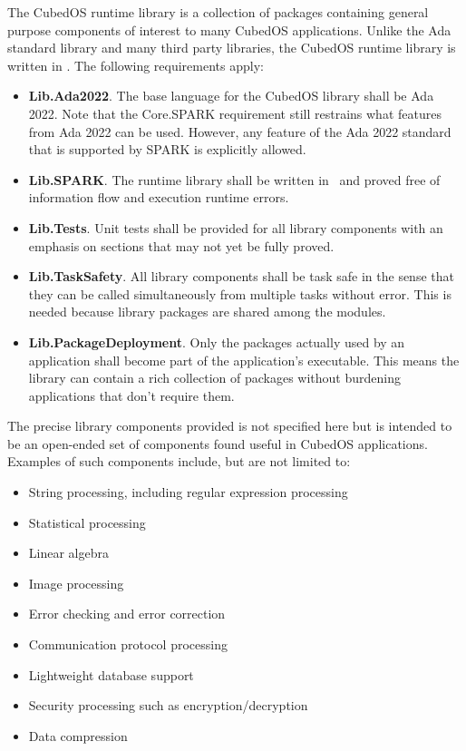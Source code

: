 The CubedOS runtime library is a collection of packages containing general purpose components of
interest to many CubedOS applications. Unlike the Ada standard library and many third party
libraries, the CubedOS runtime library is written in \SPARK. The following requirements apply:

\begin{itemize}
\item \textbf{Lib.Ada2022}. The base language for the CubedOS library shall be Ada 2022. Note
that the Core.SPARK requirement still restrains what features from Ada 2022 can be used.
However, any feature of the Ada 2022 standard that is supported by SPARK is explicitly allowed.

\item \textbf{Lib.SPARK}. The runtime library shall be written in \SPARK\ and proved free of
information flow and execution runtime errors.

\item \textbf{Lib.Tests}. Unit tests shall be provided for all library components with an
emphasis on sections that may not yet be fully proved.

\item \textbf{Lib.TaskSafety}. All library components shall be task safe in the sense that they
can be called simultaneously from multiple tasks without error. This is needed because library
packages are shared among the modules.

\item \textbf{Lib.PackageDeployment}. Only the packages actually used by an application shall
become part of the application's executable. This means the library can contain a rich
collection of packages without burdening applications that don't require them.
\end{itemize}

The precise library components provided is not specified here but is intended to be an
open-ended set of components found useful in CubedOS applications. Examples of such components
include, but are not limited to:

\begin{itemize}
\item String processing, including regular expression processing
\item Statistical processing
\item Linear algebra
\item Image processing
\item Error checking and error correction
\item Communication protocol processing
\item Lightweight database support
\item Security processing such as encryption/decryption
\item Data compression
\end{itemize}

